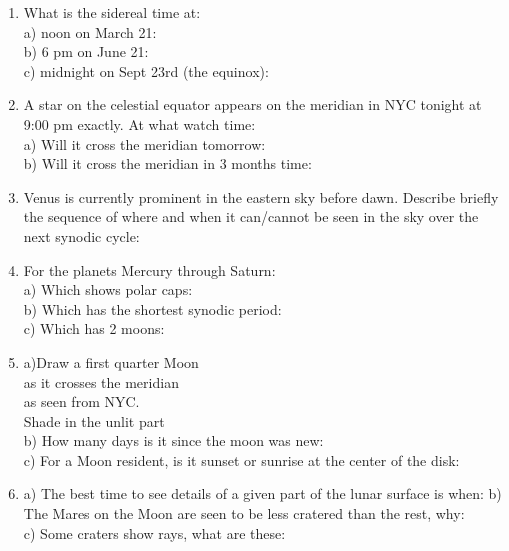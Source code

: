 \documentclass[11pt]{article}
\begin{document}
\begin{enumerate}
\vspace{0.5cm}
\item
What is the sidereal time at: \\
a) noon on March 21:  \makebox[3cm]{\hrulefill} \\
b) 6 pm on June 21:  \makebox[3cm]{\hrulefill} \\
c) midnight on Sept 23rd (the equinox):  \makebox[3cm]{\hrulefill}

\vspace{0.5cm}
\item
A star on the celestial equator appears on the meridian in NYC tonight
at 9:00 pm exactly.
At what watch time: \\
a) Will it cross the meridian tomorrow: \makebox[3cm]{\hrulefill} \\
b) Will it cross the meridian in 3 months time:
\makebox[3cm]{\hrulefill} \\

\vspace{0.5cm}
\item
Venus is currently prominent in the eastern sky before dawn. Describe
briefly the sequence of where and when it can/cannot be seen in the sky
over the next synodic cycle:



\vspace{0.8cm}
\item
For the planets Mercury through Saturn:
\\
a) Which shows polar caps:  \makebox[3cm]{\hrulefill}
\\
b) Which has the shortest synodic period: \makebox[3cm]{\hrulefill}
\\
c) Which has 2 moons:  \makebox[3cm]{\hrulefill}



\vspace{0.5cm}
\item
a)Draw a first quarter Moon \\ 
as it crosses the meridian \\
as seen from NYC. \\
Shade in the unlit part \\
b) How many days is it since the moon was new: \makebox[3cm]{\hrulefill}
\\
c) For a Moon resident, is it sunset or sunrise at the center of the disk: \makebox[3cm]{\hrulefill} 

\vspace{0.5cm}
\item 
a) The best time to see details of a given part of the lunar
 surface is when: \makebox[3cm]{\hrulefill}
b) The Mares on the Moon are seen to be less cratered than the rest, why:
\makebox[3cm]{\hrulefill}\\
c) Some craters show rays, what are these: \makebox[3cm]{\hrulefill} \\


\end{enumerate}
\end{document}
